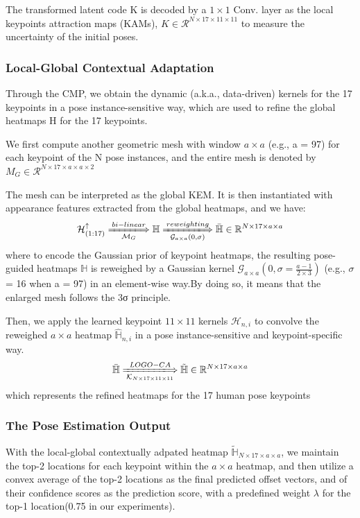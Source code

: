 \documentclass[11pt]{article}
\begin{document}
The transformed latent code K is decoded by a $1\times1$ Conv. layer as the local keypoints attraction maps (KAMs), $K\in \mathcal{R}^{N\times17\times11\times11}$ to measure the uncertainty of the initial poses.
	
\subsubsection{Local-Global Contextual Adaptation}
Through the CMP, we obtain the dynamic (a.k.a., data-driven) kernels for the 17 keypoints in a pose instance-sensitive way, which are used to refine the global heatmaps H for the 17 keypoints.
	
We first compute another geometric mesh with window $a \times a$ (e.g., a = 97) for each keypoint of the N pose instances, and the entire mesh is denoted by $M_G \in \mathcal{R}^{N\times17\times a\times a\times2}$
	
The mesh can be interpreted as the global KEM. It is then instantiated with appearance features extracted from the global heatmaps, and we have:
$$  \mathcal{H}^\uparrow_{(1:17)} \xLongrightarrow[\mathcal{M}_G]{bi-linear} \mathbb{H} \xLongrightarrow[\mathcal{G}_{a\times a}(0,\sigma)]{reweighting}\bar{\mathbb{H}}\in \mathbb{R}^{N\times17\times a\times a}$$
where to encode the Gaussian prior of keypoint heatmaps,
the resulting pose-guided heatmaps $\mathbb{H}$ is reweighed by a
Gaussian kernel $\mathcal{G}_{a\times a}(0, \sigma=\frac{a−1}{2×3})$ (e.g., $\sigma$ = 16 when
a = 97) in an element-wise way.By doing so, it means that
the enlarged mesh follows the 3σ principle.

Then, we apply the learned keypoint $11\times 11$ kernels $\mathcal{H}_{n,i}$ to convolve the reweighed $a\times a$ heatmap $\hat{\mathbb{H}}_{n,i}$ in a pose instance-sensitive and keypoint-specific way.
$$\bar{\mathbb{H}} \xLongrightarrow[\mathcal{K}_{N\times17\times 11\times11}]{LOGO-CA}\tilde{\mathbb{H}}\in \mathbb{R}^{N\times17\times a\times a} $$
which represents the refined heatmaps for the 17 human
pose keypoints
\subsubsection{The Pose Estimation Output}
With the local-global contextually adpated heatmap $\tilde{\mathbb{H}}_{N\times17\times a\times a}$, we maintain the top-2 locations for each keypoint within the $a\times a$ heatmap, and then utilize a convex average of the top-2 locations as the final predicted offset vectors, and of their confidence scores as the prediction score, with a predefined weight $\lambda$ for the top-1 location(0.75 in our experiments).
\end{document}
